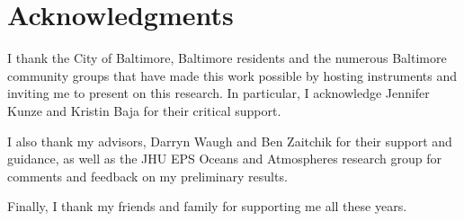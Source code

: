 \chapter*{Acknowledgments}

I thank the City of Baltimore, Baltimore residents and the numerous Baltimore community groups that have made this work possible by hosting instruments and inviting me to present on this research. In particular, I acknowledge Jennifer Kunze and Kristin Baja for their critical support. 

I also thank my advisors, Darryn Waugh and Ben Zaitchik for their support and guidance, as well as the JHU EPS Oceans and Atmospheres research group for comments and feedback on my preliminary results.

Finally, I thank my friends and family for supporting me all these years. 